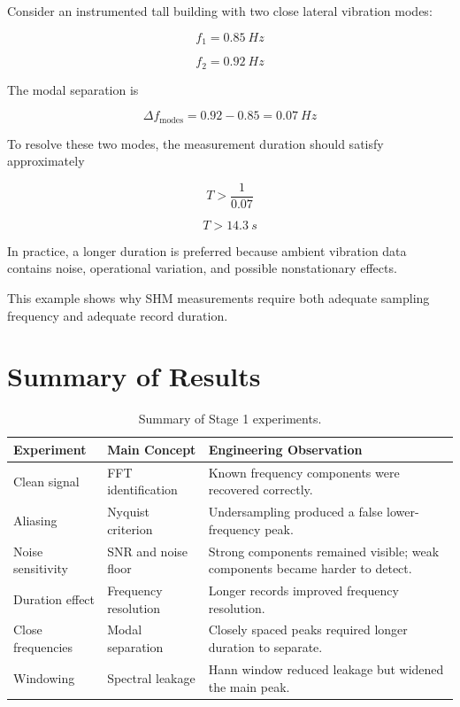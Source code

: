 \documentclass[11pt,a4paper]{article}
\begin{document}
Consider an instrumented tall building with two close lateral vibration modes:

\begin{equation}
f_1 = \SI{0.85}{Hz}
\end{equation}

\begin{equation}
f_2 = \SI{0.92}{Hz}
\end{equation}

The modal separation is

\begin{equation}
\Delta f_{\text{modes}} = 0.92 - 0.85 = \SI{0.07}{Hz}
\end{equation}

To resolve these two modes, the measurement duration should satisfy approximately

\begin{equation}
T > \frac{1}{0.07}
\end{equation}

\begin{equation}
T > \SI{14.3}{s}
\end{equation}

In practice, a longer duration is preferred because ambient vibration data contains noise, operational variation, and possible nonstationary effects.

This example shows why SHM measurements require both adequate sampling frequency and adequate record duration.

\section{Summary of Results}

\begin{table}[H]
\centering
\caption{Summary of Stage 1 experiments.}
\label{tab:summary}
\begin{tabular}{p{} p{} p{}}
\toprule
Experiment & Main Concept & Engineering Observation \\
\midrule
Clean signal & FFT identification & Known frequency components were recovered correctly. \\
Aliasing & Nyquist criterion & Undersampling produced a false lower-frequency peak. \\
Noise sensitivity & SNR and noise floor & Strong components remained visible; weak components became harder to detect. \\
Duration effect & Frequency resolution & Longer records improved frequency resolution. \\
Close frequencies & Modal separation & Closely spaced peaks required longer duration to separate. \\
Windowing & Spectral leakage & Hann window reduced leakage but widened the main peak. \\
\bottomrule
\end{tabular}
\end{table}
\end{document}
